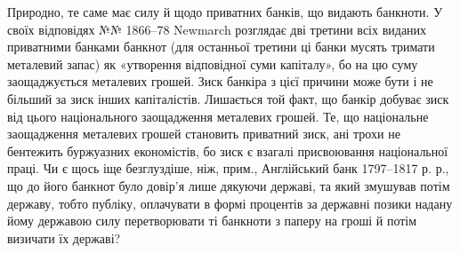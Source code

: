 Природно, те саме має силу й щодо приватних банків, що видають банкноти.
У своїх відповідях №№ 1866--78 Newmarch розглядає дві третини всіх виданих
приватними банками банкнот (для останньої третини ці банки мусять тримати
металевий запас) як «утворення відповідної суми капіталу», бо на цю суму заощаджується
металевих грошей. Зиск банкіра з цієї причини може бути і не більший
за зиск інших капіталістів. Лишається той факт, що банкір добуває зиск від цього
національного заощадження металевих грошей. Те, що національне заощадження
металевих грошей становить приватний зиск, ані трохи не бентежить буржуазних
економістів, бо зиск є взагалі присвоювання національної праці. Чи є щось
іще безглуздіше, ніж, прим., Англійський банк 1797--1817 р. р., що до його
банкнот було довір’я лише дякуючи державі, та який змушував потім державу,
тобто публіку, оплачувати в формі процентів за державні позики надану йому
державою силу перетворювати ті банкноти з паперу на гроші й потім визичати
їх державі?

